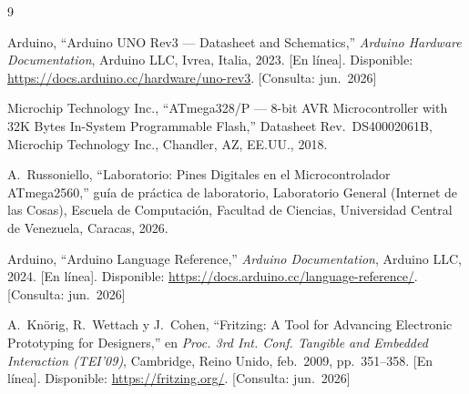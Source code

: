 \documentclass[11pt,a4paper]{article}
\begin{document}
\newpage
\begingroup
\small
\begin{thebibliography}{9}

Arduino, ``Arduino UNO Rev3 --- Datasheet and Schematics,''
\emph{Arduino Hardware Documentation}, Arduino LLC, Ivrea, Italia, 2023.
[En l\'inea]. Disponible: \url{https://docs.arduino.cc/hardware/uno-rev3}.
[Consulta: jun.~2026]

Microchip Technology Inc., ``ATmega328/P --- 8-bit AVR Microcontroller with
32K Bytes In-System Programmable Flash,'' Datasheet Rev.~DS40002061B,
Microchip Technology Inc., Chandler, AZ, EE.UU., 2018.

A.~Russoniello, ``Laboratorio: Pines Digitales en el Microcontrolador
ATmega2560,'' gu\'ia de pr\'actica de laboratorio, Laboratorio General
(Internet de las Cosas), Escuela de Computaci\'on, Facultad de Ciencias,
Universidad Central de Venezuela, Caracas, 2026.

Arduino, ``Arduino Language Reference,'' \emph{Arduino Documentation},
Arduino LLC, 2024. [En l\'inea]. Disponible:
\url{https://docs.arduino.cc/language-reference/}. [Consulta: jun.~2026]

A.~Knörig, R.~Wettach y J.~Cohen, ``Fritzing: A Tool for Advancing
Electronic Prototyping for Designers,'' en \emph{Proc. 3rd Int. Conf.
Tangible and Embedded Interaction (TEI'09)}, Cambridge, Reino Unido,
feb.~2009, pp.~351--358. [En l\'inea]. Disponible: \url{https://fritzing.org/}.
[Consulta: jun.~2026]

\end{thebibliography}
\endgroup
\end{document}

